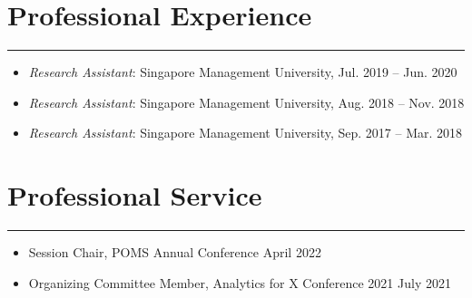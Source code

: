 \documentclass[12pt, a4paper]{article}
\begin{document}
{%

\section*{Professional Experience}
\vspace*{0.4em}
\hrule height 0.5pt
\begin{itemize}[leftmargin=36pt, itemsep=0pt, parsep=0.2pt, topsep=1pt]

	\item {\it Research Assistant}: Singapore Management University, Jul. 2019 -- Jun. 2020

	\item {\it Research Assistant}: Singapore Management University, Aug. 2018 -- Nov. 2018

  \item {\it Research Assistant}: Singapore Management University, Sep. 2017 -- Mar. 2018

\end{itemize}




\section*{Professional Service}
\vspace*{0.4em}
\hrule height 0.5pt
\begin{itemize}[leftmargin=36pt, itemsep=2pt, parsep=0pt, topsep=1pt]
	
	\item Session Chair, POMS Annual Conference \hfill April 2022

	\item Organizing Committee Member, Analytics for X Conference 2021 \hfill July 2021

\end{itemize}




}
\end{document}
